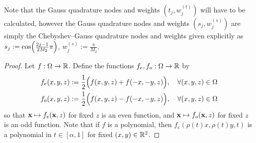 \documentclass[11pt, oneside]{article}   	%
\begin{document}
\begin{remark} 
	Note that the Gauss quadrature nodes and weights $(t_j, w_j^{(t)})$ will have to be calculated, however the Gauss quadrature nodes and weights $(s_j, w_j^{(s)})$ are simply the Chebyshev--Gauss quadrature nodes and weights given explicitly \cite[3.5.23]{DLMF} as $s_j := \cos \fpr(\frac{2j - 1}{2M_2} \pi)$, $w_j^{(s)} := \frac{\pi}{M_2}$.
\end{remark}

\begin{proof}
Let $f : \Omega \to \mathbb{R}$. Define the functions $f_e, f_o : \Omega \to \mathbb{R}$ by 
\begin{align*}
	f_e(x,y,z) &:= \frac{1}{2} \Big(f(x, y,z) + f(-x, -y,z)\Big), \quad \forall (x,y,z) \in \Omega\\
	f_o(x,y,z) &:= \frac{1}{2} \Big(f(x, y,z) - f(-x, -y,z)\Big), \quad \forall (x,y,z) \in \Omega
\end{align*}
so that $\mathbf{x} \mapsto f_e(\mathbf{x}, z)$ for fixed $z$ is an even function, and $\mathbf{x} \mapsto f_o(\mathbf{x}, z)$ for fixed $z$ is an odd function. Note that if $f$ is a polynomial, then $f_e(\rho(t)x, \rho(t)y, t)$ is a polynomial in $t \in [\alpha,1]$ for fixed $(x,y) \in \mathbb{R}^2$. 


\end{proof}
\end{document}
